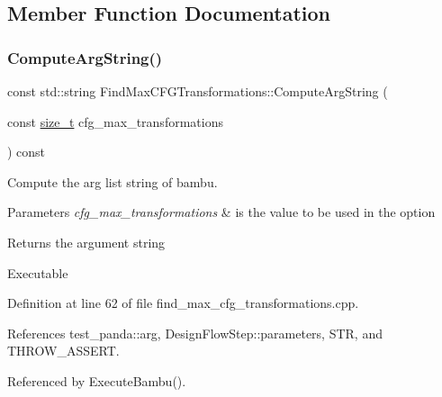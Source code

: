 \subsection{Member Function Documentation}
\mbox{\label{classFindMaxCFGTransformations_a926abf2592f4fc8ca8b030476b0cdbae}} 
\subsubsection{\texorpdfstring{Compute\+Arg\+String()}{ComputeArgString()}}
{\footnotesize\ttfamily const std\+::string Find\+Max\+C\+F\+G\+Transformations\+::\+Compute\+Arg\+String (\begin{DoxyParamCaption}\item[{const \hyperlink{tutorial__fpt__2017_2intro_2sixth_2test_8c_a7c94ea6f8948649f8d181ae55911eeaf}{size\+\_\+t}}]{cfg\+\_\+max\+\_\+transformations }\end{DoxyParamCaption}) const\hspace{0.3cm}{\ttfamily [private]}}



Compute the arg list string of bambu. 


\begin{DoxyParams}{Parameters}
{\em cfg\+\_\+max\+\_\+transformations} & is the value to be used in the option \\
\hline
\end{DoxyParams}
\begin{DoxyReturn}{Returns}
the argument string 
\end{DoxyReturn}
Executable 

Definition at line 62 of file find\+\_\+max\+\_\+cfg\+\_\+transformations.\+cpp.



References test\+\_\+panda\+::arg, Design\+Flow\+Step\+::parameters, S\+TR, and T\+H\+R\+O\+W\+\_\+\+A\+S\+S\+E\+RT.



Referenced by Execute\+Bambu().

